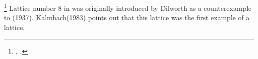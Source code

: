 \begin{remark} %
\footnote{
  ,
  ,
  }%
  Lattice number 8 in  was originally introduced by Dilworth as a counterexample to  (1937).
  Kalmbach(1983) points out that this lattice was the first example of a  lattice.
\end{remark}




